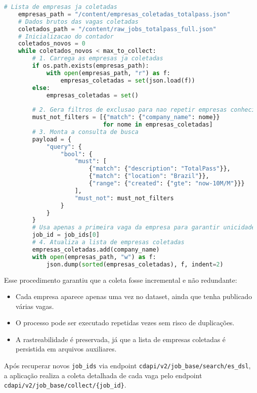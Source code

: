 \begin{lstlisting}[language=Python, caption={Deduplicação de empresas na coleta}, label={lst:deduplicacao}]
    # Lista de empresas ja coletadas
    empresas_path = "/content/empresas_coletadas_totalpass.json"
    # Dados brutos das vagas coletadas
    coletados_path = "/content/raw_jobs_totalpass_full.json"
    # Inicializacao do contador
    coletados_novos = 0
    while coletados_novos < max_to_collect:
        # 1. Carrega as empresas ja coletadas
        if os.path.exists(empresas_path):
            with open(empresas_path, "r") as f:
                empresas_coletadas = set(json.load(f))
        else:
            empresas_coletadas = set()
    
        # 2. Gera filtros de exclusao para nao repetir empresas conhecidas
        must_not_filters = [{"match": {"company_name": nome}} 
                            for nome in empresas_coletadas]
        # 3. Monta a consulta de busca
        payload = {
            "query": {
                "bool": {
                    "must": [
                        {"match": {"description": "TotalPass"}},
                        {"match": {"location": "Brazil"}},
                        {"range": {"created": {"gte": "now-10M/M"}}}
                    ],
                    "must_not": must_not_filters
                }
            }
        }
        # Usa apenas a primeira vaga da empresa para garantir unicidade
        job_id = job_ids[0]
        # 4. Atualiza a lista de empresas coletadas
        empresas_coletadas.add(company_name)
        with open(empresas_path, "w") as f:
            json.dump(sorted(empresas_coletadas), f, indent=2)
    \end{lstlisting}

Esse procedimento garantiu que a coleta fosse incremental e não redundante:
\begin{itemize}
    \item Cada empresa aparece apenas uma vez no dataset, ainda que tenha publicado várias vagas.
    \item O processo pode ser executado repetidas vezes sem risco de duplicações.
    \item A rastreabilidade é preservada, já que a lista de empresas coletadas é persistida em arquivos auxiliares.
\end{itemize}

Após recuperar novos \texttt{job\_ids} via endpoint \texttt{cdapi/v2/job\_base/search/es\_dsl}, a aplicação realiza a coleta detalhada de cada vaga pelo endpoint \texttt{cdapi/v2/job\_base/collect/\{job\_id\}}.

